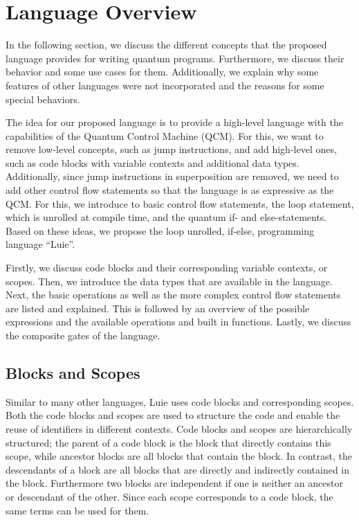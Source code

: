 \section{Language Overview}
In the following section, we discuss the different concepts that the proposed language provides for writing quantum programs. Furthermore, we discuss their behavior and some use cases for them. Additionally, we explain why some features of other languages were not incorporated and the reasons for some special behaviors. 

The idea for our proposed language is to provide a high-level language with the capabilities of the Quantum Control Machine (QCM). For this, we want to remove low-level concepts, such as jump instructions, and add high-level ones, such as code blocks with variable contexts and additional data types. Additionally, since jump instructions in superposition are removed, we need to add other control flow statements so that the language is as expressive as the QCM. For this, we introduce to basic control flow statements, the loop statement, which is unrolled at compile time, and the quantum if- and else-statements. Based on these ideas, we propose the loop unrolled, if-else, programming language ``Luie''.

Firstly, we discuss code blocks and their corresponding variable contexts, or scopes. Then, we introduce the data types that are available in the language. Next, the basic operations as well as the more complex control flow statements are listed and explained. This is followed by an overview of the possible expressions and the available operations and built in functions. Lastly, we discuss the composite gates of the language. 


\subsection{Blocks and Scopes}
\label{sec:concept_blocksAndScope}
Similar to many other languages, Luie uses code blocks and corresponding scopes. Both the code blocks and scopes are used to structure the code and enable the reuse of identifiers in different contexts. Code blocks and scopes are hierarchically structured; the parent of a code block is the block that directly contains this scope, while ancestor blocks are all blocks that contain the block.
In contrast, the descendants of a block are all blocks that are directly and indirectly contained in the block. Furthermore two blocks are independent if one is neither an ancestor or descendant of the other. Since each scope corresponds to a code block, the same terms can be used for them.

